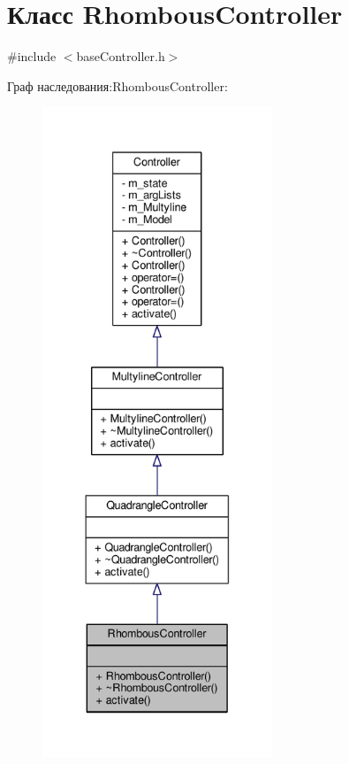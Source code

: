 \hypertarget{class_rhombous_controller}{\section{Класс Rhombous\-Controller}
\label{class_rhombous_controller}
}


{\ttfamily \#include $<$base\-Controller.\-h$>$}



Граф наследования\-:Rhombous\-Controller\-:
\nopagebreak
\begin{figure}[H]
\begin{center}
\leavevmode
\includegraphics[height=550pt]{class_rhombous_controller__inherit__graph}
\end{center}
\end{figure}



